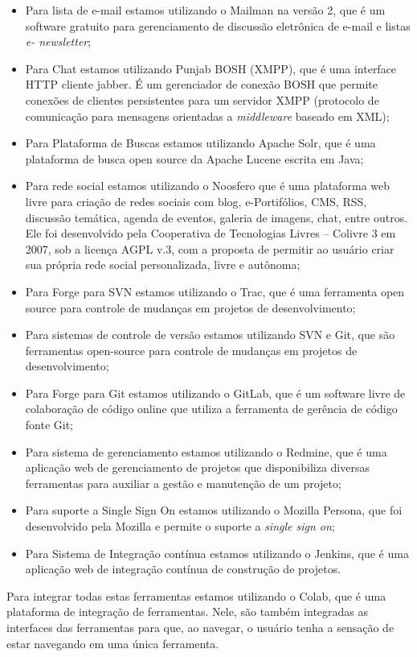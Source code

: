 \begin{itemize}

\item Para lista de e-mail estamos utilizando o Mailman na versão 2, que é um software gratuito para gerenciamento de discussão eletrônica de e-mail e listas {\it e- newsletter};

\item Para Chat estamos utilizando Punjab BOSH (XMPP), que é uma interface HTTP cliente jabber. É um gerenciador de conexão BOSH que permite conexões de clientes persistentes para um servidor XMPP (protocolo de comunicação para mensagens orientadas a {\it middleware} baseado em XML);

\item Para Plataforma de Buscas estamos utilizando Apache Solr, que é uma plataforma de busca open source da Apache Lucene escrita em Java;

\item Para rede social estamos utilizando o Noosfero que é uma plataforma web livre para criação de redes sociais com blog, e-Portifólios, CMS, RSS, discussão temática, agenda de eventos, galeria de imagens, chat, entre outros. Ele foi desenvolvido pela Cooperativa de Tecnologias Livres – Colivre 3 em 2007, sob a licença AGPL v.3, com a proposta de permitir ao usuário criar sua própria rede social personalizada, livre e autônoma;

\item Para Forge para SVN estamos utilizando o Trac, que é uma ferramenta open source para controle de mudanças em projetos de desenvolvimento;

\item Para sistemas de controle de versão estamos utilizando SVN e Git, que são ferramentas open-source para controle de mudanças em projetos de desenvolvimento;

\item Para Forge para Git estamos utilizando o GitLab, que é um software livre de colaboração de código online que utiliza a ferramenta de gerência de código fonte Git;

\item Para sistema de gerenciamento estamos utilizando o Redmine, que é uma aplicação web de gerenciamento de projetos que disponibiliza diversas ferramentas para auxiliar a gestão e manutenção de um projeto;

\item Para suporte a Single Sign On estamos utilizando o Mozilla Persona, que foi desenvolvido pela Mozilla e permite o suporte a {\it single sign on};

\item Para Sistema de Integração contínua estamos utilizando o Jenkins, que é uma aplicação web de integração contínua de construção de projetos.
\end{itemize}


Para integrar todas estas ferramentas estamos utilizando o Colab, que é uma plataforma de integração de ferramentas. Nele, são também integradas as interfaces das ferramentas para que, ao navegar, o usuário tenha a sensação de estar navegando em uma única ferramenta.

